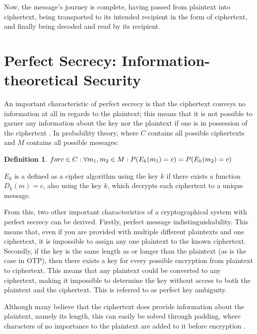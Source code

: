 \documentclass[12pt, a4paper]{report}
\theoremstyle{definition}
\newtheorem{defin}[thm]{Definition}
\theoremstyle{remark}
\begin{document}
Now, the message's journey is complete, having passed from plaintext into ciphertext, being transported to its intended recipient in the form of ciphertext, and finally being decoded and read by its recipient. 

\section{Perfect Secrecy: Information-theoretical Security}
An important characteristic of perfect secrecy is that the ciphertext conveys no information at all in regards to the plaintext; this means that it is not possible to garner any information about the key nor the plaintext if one is in possession of the ciphertext \cite{PerfectSecrecy} \cite{HandbookOfAppliedCryptography}. In probability theory, where $C$ contains all possible ciphertexts and $M$ contains all possible messages:

\hfill
\begin{defin}\label{def:perfectsecrecy}
$for c \in C: \\
\forall m_1, m_2 \in M: \\
P(E_k(m_1)=c) = P(E_k(m_2)=c)$
\end{defin}

$E_k$ is a defined as a cipher algorithm using the key $k$ if there exists a function $D_k(m)=c$, also using the key $k$, which decrypts each ciphertext to a unique message.

From this, two other important characteristics of a cryptographical system with perfect secrecy can be derived. Firstly, perfect message indistinguishability. This means that, even if you are provided with multiple different plaintexts and one ciphertext, it is impossible to assign any one plaintext to the known ciphertext. Secondly, if the key is the same length as or longer than the plaintext (as is the case in OTP), then there exists a key for every possible encryption from plaintext to ciphertext. This means that any plaintext could be converted to any ciphertext, making it impossible to determine the key without access to both the plaintext and the ciphertext. This is referred to as perfect key ambiguity.		%

Although many believe that the ciphertext does provide information about the plaintext, namely its length, this can easily be solved through padding, where characters of no importance to the plaintext are added to it before encryption \cite{HutSix}.
\end{document}
